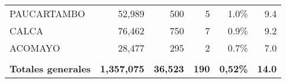 \begin{tabular}{lrrrrr}
	\cellcolor[HTML]{FFFFC7}PAUCARTAMBO   & 52,989                                                         & 500                                                                             & 5                                                              & 1.0\%                                                                  & 9.4                                                                                                                                \\
	\cellcolor[HTML]{FFFFC7}CALCA         & 76,462                                                         & 750                                                                             & 7                                                              & 0.9\%                                                                  & 9.2                                                                                                                                \\
	\cellcolor[HTML]{FFFFC7}ACOMAYO       & 28,477                                                         & 295                                                                             & 2                                                              & 0.7\%                                                                  & 7.0                                                                                                                                \\
	&                                                                &                                                                                 &                                                                &                                                                        &                                                                                                                                    \\
	\rowcolor[HTML]{ECF4FF} 
	\textbf{Totales generales}            & \textbf{1,357,075}                                             & \textbf{36,523}                                                                 & \textbf{190}                                                   & \textbf{0,52\%}                                                        & \textbf{14.0}                                                                                                                     
\end{tabular}